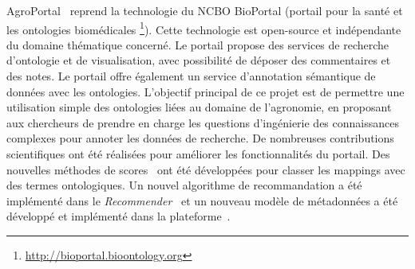 AgroPortal~\cite{Jonquet2016,Jonquet2018} reprend la technologie du NCBO BioPortal (portail pour la santé et les ontologies biomédicales \footnote{\url{http://bioportal.bioontology.org}}). Cette technologie est open-source et indépendante du domaine thématique concerné. Le portail propose des services de recherche d'ontologie et de visualisation, avec possibilité de déposer des commentaires et des notes. Le portail offre également un service d'annotation sémantique de données avec les ontologies. L'objectif principal de ce projet est de permettre une utilisation simple des ontologies liées au domaine de l'agronomie, en proposant aux chercheurs de prendre en charge les questions d'ingénierie des connaissances complexes pour annoter les données de recherche. De nombreuses contributions scientifiques ont été réalisées pour améliorer les fonctionnalités du portail. Des nouvelles méthodes de scores~\cite{Melzi} ont été développées pour classer les mappings avec des termes ontologiques. Un nouvel algorithme de recommandation a été implémenté dans le \textit{Recommender}~\cite{RomeroJOGPM16} et un nouveau modèle de métadonnées a été développé et implémenté dans la plateforme~\cite{toulet:lirmm-01397388}.\\

